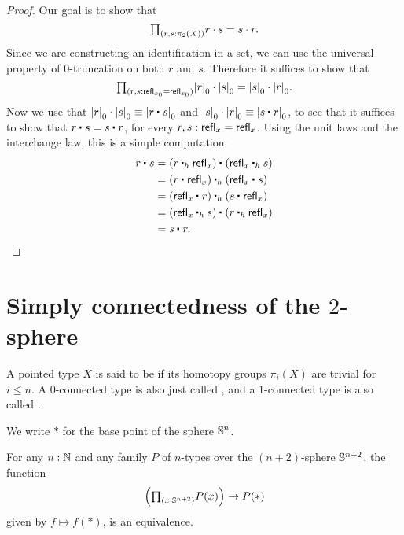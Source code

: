 \begin{proof}
Our goal is to show that 
\begin{equation*}
\prd{r,s:\pi_2(X)} r\cdot s=s\cdot r.
\end{equation*}
Since we are constructing an identification in a set, we can use the universal property of $0$-truncation on both $r$ and $s$. Therefore it suffices to show that
\begin{equation*}
\prd{r,s:\refl{x_0}=\refl{x_0}} \tproj{0}r\cdot \tproj{0}s=\tproj{0}s\cdot \tproj{0}r.
\end{equation*}
Now we use that $\tproj{0}{r}\cdot\tproj{0}{s}\jdeq \tproj{0}{\ct{r}{s}}$ and $\tproj{0}{s}\cdot\tproj{0}{r}\jdeq \tproj{0}{\ct{s}{r}}$, to see that it suffices to show that $\ct{r}{s}=\ct{s}{r}$, for every $r,s:\mathsf{refl}_{x}=\mathsf{refl}_{x}$. Using the unit laws and the interchange law, this is a simple computation:
\begin{align*}
\ct{r}{s} & = \ct{(\ct[h]{r}{\refl{x}})}{(\ct[h]{\refl{x}}{s})} \\
& = \ct[h]{(\ct{r}{\refl{x}})}{(\ct{\refl{x}}{s})} \\
& = \ct[h]{(\ct{\refl{x}}{r})}{(\ct{s}{\refl{x}})} \\
& = \ct{(\ct[h]{\refl{x}}{s})}{(\ct[h]{r}{\refl{x}})} \\
& = \ct{s}{r}.\qedhere
\end{align*}
\end{proof}

\section{Simply connectedness of the $2$-sphere}

\begin{defn}
A pointed type $X$ is said to be  if its homotopy groups $\pi_i(X)$ are trivial for $i\leq n$. A $0$-connected type is also just called , and a $1$-connected type is also called . 
\end{defn}

We write $\ast$ for the base point of the sphere $\mathbb{S}^{n}$.

\begin{thm}
For any $n:\mathbb{N}$ and any family $P$ of $n$-types over the $(n+2)$-sphere $\mathbb{S}^{n+2}$, the function
\begin{equation*}
\Big(\prd{x:\sphere{n+2}}P(x)\Big)\to P(\ast)
\end{equation*}
given by $f\mapsto f(\ast)$, is an equivalence.
\end{thm}

